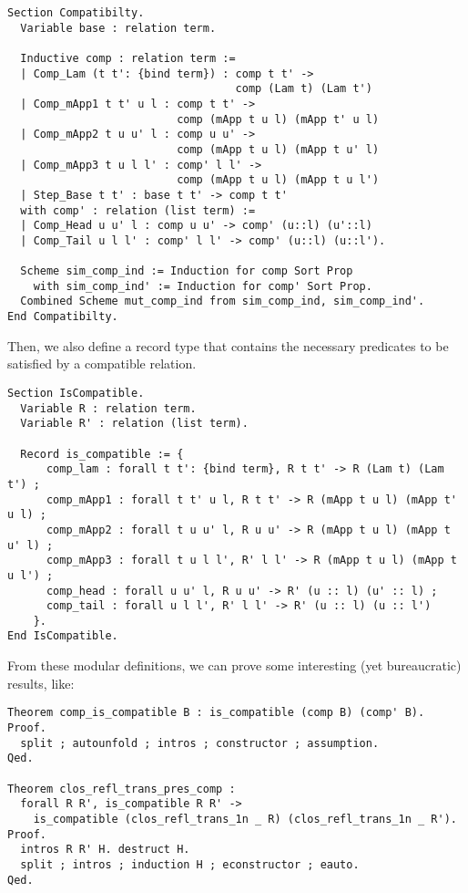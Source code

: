 \begin{lstlisting}[language=Coq]
Section Compatibilty.
  Variable base : relation term.
  
  Inductive comp : relation term :=
  | Comp_Lam (t t': {bind term}) : comp t t' ->
                                   comp (Lam t) (Lam t')
  | Comp_mApp1 t t' u l : comp t t' ->
                          comp (mApp t u l) (mApp t' u l)
  | Comp_mApp2 t u u' l : comp u u' ->
                          comp (mApp t u l) (mApp t u' l)
  | Comp_mApp3 t u l l' : comp' l l' ->
                          comp (mApp t u l) (mApp t u l')
  | Step_Base t t' : base t t' -> comp t t'
  with comp' : relation (list term) :=
  | Comp_Head u u' l : comp u u' -> comp' (u::l) (u'::l)
  | Comp_Tail u l l' : comp' l l' -> comp' (u::l) (u::l').

  Scheme sim_comp_ind := Induction for comp Sort Prop
    with sim_comp_ind' := Induction for comp' Sort Prop.
  Combined Scheme mut_comp_ind from sim_comp_ind, sim_comp_ind'.
End Compatibilty.
\end{lstlisting}

Then, we also define a record type that contains the necessary predicates to be satisfied by a compatible relation.

\begin{lstlisting}[language=Coq]
Section IsCompatible.
  Variable R : relation term.
  Variable R' : relation (list term).

  Record is_compatible := {
      comp_lam : forall t t': {bind term}, R t t' -> R (Lam t) (Lam t') ;
      comp_mApp1 : forall t t' u l, R t t' -> R (mApp t u l) (mApp t' u l) ;
      comp_mApp2 : forall t u u' l, R u u' -> R (mApp t u l) (mApp t u' l) ;
      comp_mApp3 : forall t u l l', R' l l' -> R (mApp t u l) (mApp t u l') ;
      comp_head : forall u u' l, R u u' -> R' (u :: l) (u' :: l) ;
      comp_tail : forall u l l', R' l l' -> R' (u :: l) (u :: l')
    }.
End IsCompatible.
\end{lstlisting}

From these modular definitions, we can prove some interesting (yet bureaucratic) results, like:

\begin{lstlisting}[language=Coq]
Theorem comp_is_compatible B : is_compatible (comp B) (comp' B).
Proof.
  split ; autounfold ; intros ; constructor ; assumption.
Qed.

Theorem clos_refl_trans_pres_comp :
  forall R R', is_compatible R R' ->
    is_compatible (clos_refl_trans_1n _ R) (clos_refl_trans_1n _ R').
Proof.
  intros R R' H. destruct H. 
  split ; intros ; induction H ; econstructor ; eauto.
Qed.
\end{lstlisting}

